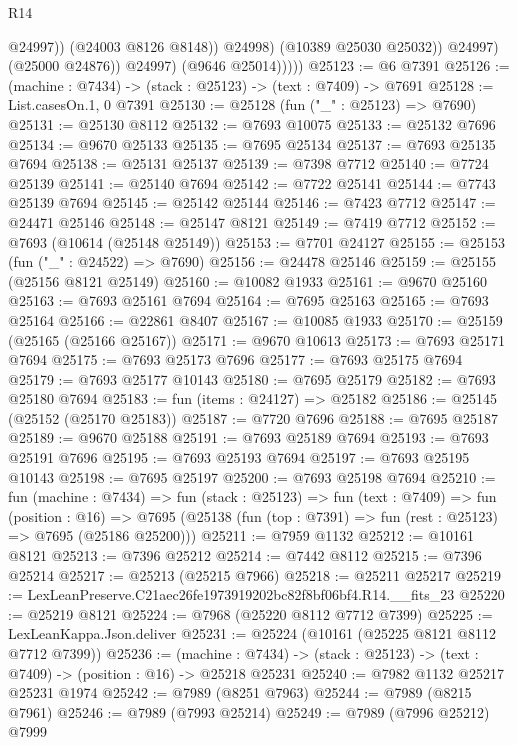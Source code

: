 \begin{lexlean}{R14}
\begin{coremodule}
                            @24997))
                        (@24003 @8126 @8148))
                      @24998)
                    (@10389 @25030 @25032))
                  @24997)
                (@25000 @24876))
              @24997)
            (@9646 @25014)))))
@25123 := @6 @7391
@25126 := (machine : @7434) -> (stack : @25123) -> (text : @7409) -> @7691
@25128 := List.casesOn.{1, 0} @7391
@25130 := @25128 (fun ("_" : @25123) => @7690)
@25131 := @25130 @8112
@25132 := @7693 @10075
@25133 := @25132 @7696
@25134 := @9670 @25133
@25135 := @7695 @25134
@25137 := @7693 @25135 @7694
@25138 := @25131 @25137
@25139 := @7398 @7712
@25140 := @7724 @25139
@25141 := @25140 @7694
@25142 := @7722 @25141
@25144 := @7743 @25139 @7694
@25145 := @25142 @25144
@25146 := @7423 @7712
@25147 := @24471 @25146
@25148 := @25147 @8121
@25149 := @7419 @7712
@25152 := @7693 (@10614 (@25148 @25149))
@25153 := @7701 @24127
@25155 := @25153 (fun ("_" : @24522) => @7690)
@25156 := @24478 @25146
@25159 := @25155 (@25156 @8121 @25149)
@25160 := @10082 @1933
@25161 := @9670 @25160
@25163 := @7693 @25161 @7694
@25164 := @7695 @25163
@25165 := @7693 @25164
@25166 := @22861 @8407
@25167 := @10085 @1933
@25170 := @25159 (@25165 (@25166 @25167))
@25171 := @9670 @10613
@25173 := @7693 @25171 @7694
@25175 := @7693 @25173 @7696
@25177 := @7693 @25175 @7694
@25179 := @7693 @25177 @10143
@25180 := @7695 @25179
@25182 := @7693 @25180 @7694
@25183 := fun (items : @24127) => @25182
@25186 := @25145 (@25152 (@25170 @25183))
@25187 := @7720 @7696
@25188 := @7695 @25187
@25189 := @9670 @25188
@25191 := @7693 @25189 @7694
@25193 := @7693 @25191 @7696
@25195 := @7693 @25193 @7694
@25197 := @7693 @25195 @10143
@25198 := @7695 @25197
@25200 := @7693 @25198 @7694
@25210 := fun (machine : @7434) =>
  fun (stack : @25123) =>
  fun (text : @7409) =>
  fun (position : @16) =>
  @7695 (@25138 (fun (top : @7391) => fun (rest : @25123) => @7695 (@25186 @25200)))
@25211 := @7959 @1132
@25212 := @10161 @8121
@25213 := @7396 @25212
@25214 := @7442 @8112
@25215 := @7396 @25214
@25217 := @25213 (@25215 @7966)
@25218 := @25211 @25217
@25219 := LexLeanPreserve.C21aec26fe1973919202bc82f8bf06bf4.R14.__fits_23
@25220 := @25219 @8121
@25224 := @7968 (@25220 @8112 @7712 @7399)
@25225 := LexLeanKappa.Json.deliver
@25231 := @25224 (@10161 (@25225 @8121 @8112 @7712 @7399))
@25236 := (machine : @7434) ->
  (stack : @25123) -> (text : @7409) -> (position : @16) -> @25218 @25231
@25240 := @7982 @1132 @25217 @25231 @1974
@25242 := @7989 (@8251 @7963)
@25244 := @7989 (@8215 @7961)
@25246 := @7989 (@7993 @25214)
@25249 := @7989 (@7996 @25212) @7999

\end{coremodule}
\end{lexlean}
